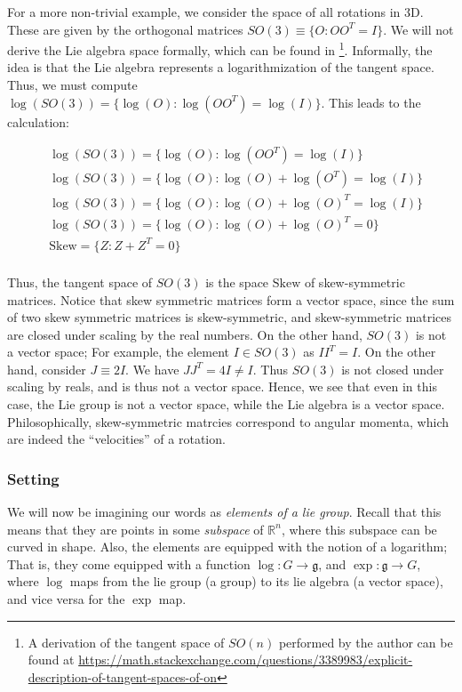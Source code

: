 \documentclass[11pt]{book}
\newcommand{\skewsym}{\mathrm{Skew}}
\begin{document}
For a more non-trivial example, we consider the space of all rotations in 3D. These are given
by the orthogonal matrices $SO(3) \equiv \{ O : O O ^T = I \}$. We will not derive the Lie algebra
space formally, which can be found in \cite{absil2009optimisation} \footnote{A derivation of the tangent space of $SO(n)$
performed by the author can be found at \url{https://math.stackexchange.com/questions/3389983/explicit-description-of-tangent-spaces-of-on}}.
Informally, the idea is that the Lie algebra represents a logarithmization of the tangent space. Thus,
we must compute $\log(SO(3)) = \{ \log(O): \log(O O^T) = \log(I) \}$. This leads to the calculation:

\begin{align*}
&\log(SO(3)) = \{ \log(O): \log(O O^T) = \log(I) \} \\
&\log(SO(3)) = \{ \log(O): \log(O) + \log(O^T) = \log(I) \} \\
&\log(SO(3)) = \{ \log(O): \log(O) + \log(O)^T = \log(I) \} \\
&\log(SO(3)) = \{ \log(O): \log(O) + \log(O)^T = 0 \} \\
&\skewsym = \{ Z: Z + Z^T = 0 \} \\
\end{align*}

Thus, the tangent space of $SO(3)$ is the space $\skewsym$ of skew-symmetric matrices. Notice that skew symmetric
matrices form a vector space, since the sum of two skew symmetric matrices is skew-symmetric, and skew-symmetric
matrices are closed under scaling by the real numbers. On the other hand, $SO(3)$ is not a vector space; For example,
the element $I \in SO(3)$ as $I I^T = I$. On the other hand, consider $J \equiv 2I$. We have
$J J^T = 4I \neq I$. Thus $SO(3)$ is not closed under scaling by reals, and is thus not a vector space. Hence,
we see that even in this case, the Lie group is not a vector space, while the Lie algebra is a vector space.
Philosophically, skew-symmetric matrcies correspond to angular momenta, which are indeed the ``velocities''
of a rotation.


\subsubsection{Setting} We will now be imagining our words as \emph{elements of a lie group}. Recall that this means that
they are points in some \emph{subspace} of $\mathbb R^n$, where this subspace can be curved in shape.
Also, the elements are equipped with the notion of a logarithm; That is, they come equipped with a
function $\log : G \rightarrow \mathfrak g$, and $\exp: \mathfrak g \rightarrow G$,
where $\log$ maps from the lie group (a group) to its lie algebra (a vector space),
and vice versa for the $\exp$ map.
\end{document}
